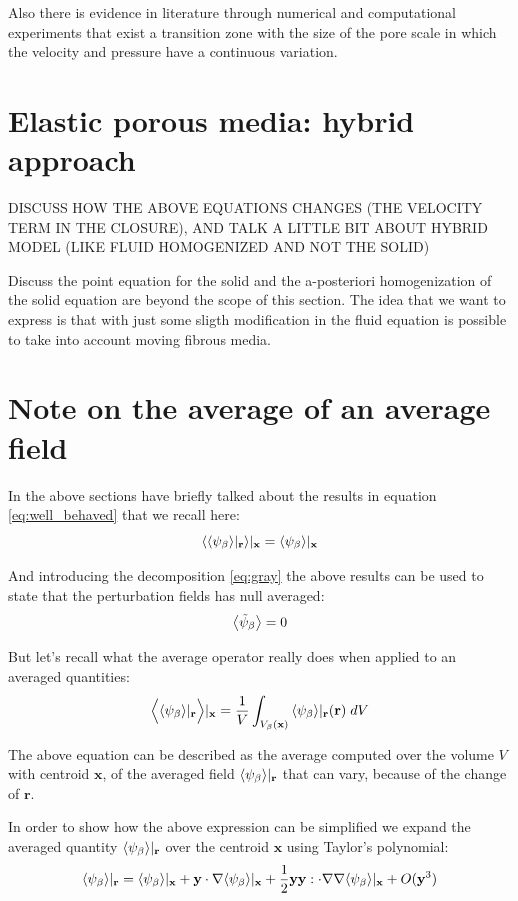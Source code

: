 Also there is evidence in literature through numerical and computational experiments \citet{ochoa2017fluid} that exist a transition zone with the size of the pore scale in which the velocity and pressure have a continuous variation.

\section{Elastic porous media: hybrid approach}

DISCUSS HOW THE ABOVE EQUATIONS CHANGES (THE VELOCITY TERM IN THE CLOSURE), AND TALK A LITTLE BIT ABOUT HYBRID MODEL (LIKE FLUID HOMOGENIZED AND NOT THE SOLID)

Discuss the point equation for the solid and the a-posteriori homogenization of the solid equation are beyond the scope of this section.
The idea that we want to express is that with just some sligth modification in the fluid equation is possible to take into account moving fibrous media.

\section{Note on the average of an average field}
\label{ch:appendix_a}

In the above sections have briefly talked about the results in equation \ref{eq:well_behaved} that we recall here:
$${\left< {\left< \psi_{\beta} \right>}|_{\mathbf{r}} \right>}|_{\mathbf{x}} = {\left< \psi_{\beta} \right>}|_{\mathbf{x}}$$

And introducing the decomposition \ref{eq:gray} the above results can be used to state that the perturbation fields has null averaged:
$$  {\left< \tilde{\psi}_{\beta} \right>} = 0 $$

But let's recall what the average operator really does when applied to an averaged quantities:
$$  \Big< {\left< \psi_{\beta} \right>}|_{\mathbf{r}} \Big>|_{\mathbf{x}}  = \dfrac{1}{V} \int_{V_\beta(\mathbf{x})} {\left< \psi_{\beta} \right>}|_{\mathbf{r}}(\mathbf{r}) \; dV $$

The above equation can be described as the average computed over the volume $V$ with centroid $\mathbf{x}$, of the averaged field ${\left< \psi_{\beta} \right>}|_{\mathbf{r}}$ that can vary, because of the change of $\mathbf{r}$.

In order to show how the above expression can be simplified we expand the averaged quantity ${\left< \psi_{\beta} \right>}|_{\mathbf{r}}$ over the centroid $\mathbf{x}$ using Taylor's polynomial:
$$
{\left< \psi_{\beta} \right>}|_{\mathbf{r}} = {\left< \psi_{\beta} \right>}|_{\mathbf{x}} + \mathbf{y} \cdot \nabla {\left< \psi_{\beta} \right>}|_{\mathbf{x}} + \dfrac{1}{2} \mathbf{y}\mathbf{y} : \cdot \nabla \nabla {\left< \psi_{\beta} \right>}|_{\mathbf{x}} + O(\mathbf{y}^3)
$$

